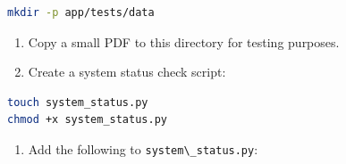 \documentclass[
  screen,review,acmlarge]{acmart}
\newcommand{\passthrough}[1]{#1}
\providecommand{\tightlist}{%
  \setlength{\itemsep}{0pt}\setlength{\parskip}{0pt}}
\begin{document}
\begin{lstlisting}[language=bash]
mkdir -p app/tests/data
\end{lstlisting}

\begin{enumerate}
\def\labelenumi{\arabic{enumi}.}
\setcounter{enumi}{3}
\item
  Copy a small PDF to this directory for testing purposes.
\item
  Create a system status check script:
\end{enumerate}

\begin{lstlisting}[language=bash]
touch system_status.py
chmod +x system_status.py
\end{lstlisting}

\begin{enumerate}
\def\labelenumi{\arabic{enumi}.}
\setcounter{enumi}{5}
\tightlist
\item
  Add the following to \passthrough{\lstinline!system\_status.py!}:
\end{enumerate}
\end{document}
